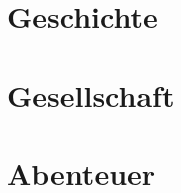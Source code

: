 \documentclass[a4paper,12pt,%
headsepline,%
numbers=noenddot,%
]{scrreprt}
\begin{document}
\part{Geschichte}


\part{Gesellschaft}







\part{Abenteuer}



\end{document}
